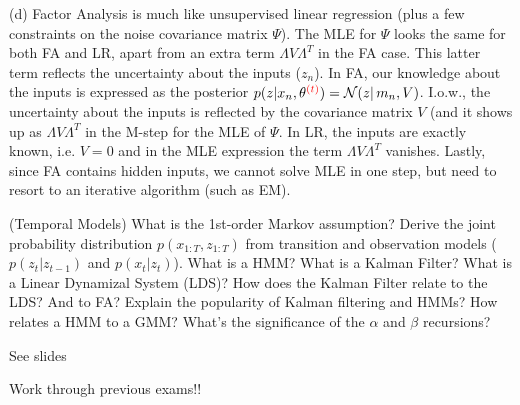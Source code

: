 \documentclass[a4paper]{article}
\newcommand{\N}{\mathcal{N}}
\def\r#1{{\color{red}#1}}
\begin{document}
\begin{ExerciseList}
(d) Factor Analysis is much like unsupervised linear regression (plus a few constraints on the noise covariance matrix $\Psi$). The MLE for $\Psi$ looks the same for both FA and LR, apart from an extra term $\Lambda V \Lambda^T$ in the FA case. This latter term reflects the uncertainty about the inputs ($z_n$). In FA, our knowledge about the inputs is expressed as the posterior $p(z|x_n,\theta^{\r{(t)}}) = \N(z|\,m_n,V)$. I.o.w., the uncertainty about the inputs is reflected by the covariance matrix $V$ (and it shows up as $\Lambda V \Lambda^T$ in the M-step for the MLE of $\Psi$. In LR, the inputs are exactly known, i.e. $V=0$ and in the MLE expression the term $\Lambda V \Lambda^T$ vanishes. Lastly, since FA contains hidden inputs, we cannot solve MLE in one step, but need to resort to an iterative algorithm (such as EM).

\Exercise[label={ex:7}] (Temporal Models)
What is the 1st-order Markov assumption? Derive the joint probability distribution $p(x_{1:T},z_{1:T})$ from transition and observation models ($p(z_t|z_{t-1})$ and $p(x_t|z_t)$). What is a HMM? What is a Kalman Filter? What is a Linear Dynamizal System (LDS)? How does the Kalman Filter relate to the LDS? And to FA? Explain the popularity of Kalman filtering and HMMs? How relates a HMM to a GMM? What's the significance of the $\alpha$ and $\beta$ recursions?

\Answer[ref={ex:7}]
See slides

\Exercise[label={final}] 
Work through previous exams!!


\end{ExerciseList}
\end{document}
